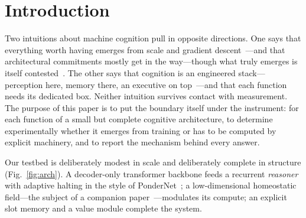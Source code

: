 \documentclass{article}
\newcommand{\NbLHuno}{$+0.1312$} \newcommand{\NbLHunoIC}{$[+0.1124,\,+0.1502]$}
\newcommand{\NbLHunoSuave}{$+0.019$}
\newcommand{\NbLFracCliff}{$0.759$} \newcommand{\NbLFracSuave}{$0.763$}
\newcommand{\FracDif}{$-0.004$} \newcommand{\FracDifIC}{$[-0.150,\,+0.241]$}
\newcommand{\RatioRangos}{$5.1\times$} \newcommand{\RatioRangosIC}{$[3.4,\,8.2]$}
\newcommand{\compcite}{\citep{anon2026governor}}
\newcommand{\compcite}{\citep{arrabal2026governor}}
\begin{document}
\begin{abstract}
through a readout the other did not share. Almost every negative result in the
program carries its mechanism---the exceptions are declared as
unadjudicated---and the protocol that produced
them---preregistration, adversarial panels, kill-gates, replication rules, and
positive controls for every null we assert---is part of the contribution. We close by
executing our own falsifiable prediction. In a cliff-cost family, where the
compute an instance needs is invisible until it is spent, value under
commitment pays \NbLHuno{} \NbLHunoIC{}, roughly seven times the point
estimate (\NbLHunoSuave{}) in a smooth
family---yet not because the cliff shifts information toward ex-ante decisions
(the ex-ante fraction of the attainable range is \NbLFracCliff{} versus
\NbLFracSuave{}; difference \FracDif{} \FracDifIC{}, a post-hoc
observation compatible with equality but imprecisely estimated), but
because it multiplies the attainable range fivefold (\RatioRangos{}
\RatioRangosIC). On this evidence the magnitude of an allocation problem and
the structure of its information behave as separate axes---the first measured
decisively, the second only bounded.
\end{abstract}

\section{Introduction}\label{sec:intro}

Two intuitions about machine cognition pull in opposite directions. One says
that everything worth having emerges from scale and gradient
descent~\citep{wei2022emergent}---and that architectural commitments mostly
get in the way---though what truly emerges is itself
contested~\citep{schaeffer2023mirage}. The other says that cognition is an
engineered stack---perception here, memory there, an executive on
top~\citep{anderson2004integrated,laird2012soar,lecun2022path}---and that
each function needs its dedicated box. Neither intuition
survives contact with measurement. The purpose of this paper is to put the
boundary itself under the instrument: for each function of a small but
complete cognitive architecture, to determine experimentally whether it
emerges from training or has to be computed by explicit machinery, and to
report the mechanism behind every answer.

Our testbed is deliberately modest in scale and deliberately complete in
structure (Fig.~\ref{fig:arch}). A decoder-only transformer backbone feeds a
recurrent \emph{reasoner} with adaptive halting in the style of
PonderNet~\citep{banino2021pondernet,graves2016act,dehghani2019universal}; a
low-dimensional homeostatic field---the subject of a companion
paper~\compcite{}---modulates its compute; an explicit slot
memory and a value module complete the system.
\end{document}
